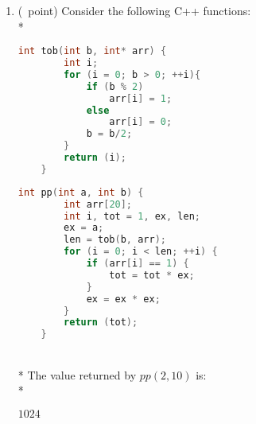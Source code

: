 \documentclass[14pt]{article}
\begin{document}
\begin{enumerate}[label=\alph*)]
    \item (\textonequarter\ point)
    Consider the following C++ functions: \\*
    \noindent\begin{minipage}{.45\textwidth}
    \begin{lstlisting}[language=C++, title={Part (d) - I}]
    int tob(int b, int* arr) {
        int i;
        for (i = 0; b > 0; ++i){
            if (b % 2) 
                arr[i] = 1;
            else
                arr[i] = 0;
            b = b/2;
        }
        return (i);
    }
    \end{lstlisting}
    \end{minipage}\hfill
    \begin{minipage}{.45\textwidth}
    \begin{lstlisting}[language=C++, title={Part (d) - II}]
    int pp(int a, int b) {
        int arr[20];
        int i, tot = 1, ex, len;
        ex = a;
        len = tob(b, arr);
        for (i = 0; i < len; ++i) {
            if (arr[i] == 1) {
                tot = tot * ex;
            }
            ex = ex * ex;
        }
        return (tot);
    }
    \end{lstlisting}
    \end{minipage}
    \\* The value returned by $pp(2, 10)$ is: \\*
    \begin{myframe}[width=500pt,height=20pt,top=2pt,bottom=2.5pt,left=200pt,right=200pt,arc=10pt,auto outer arc]
    $1024$
    \end{myframe}
\end{enumerate}
\end{document}
